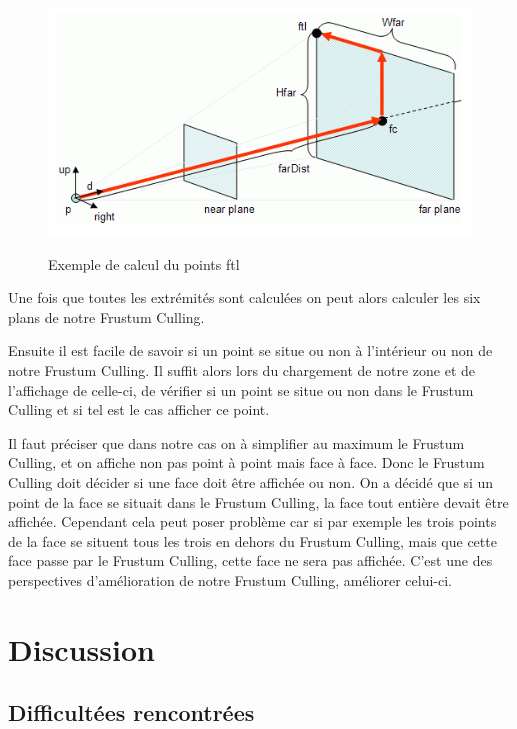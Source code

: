 \documentclass{report}
\begin{document}
			\begin{figure}[!h]
				\centering
				\includegraphics[scale=0.9]{images/pointsPlans.png}\\
				\caption{Exemple de calcul du points ftl}
				\label{calcul point}
			\end{figure}
			
			Une fois que toutes les extrémités sont calculées on peut alors calculer les six plans de notre Frustum Culling.
			
			Ensuite il est facile de savoir si un point se situe ou non à l'intérieur ou non de notre Frustum Culling. Il suffit alors lors du chargement de notre zone et de l'affichage de celle-ci, de vérifier si un point se situe ou non dans le Frustum Culling et si tel est le cas afficher ce point.
																						
			Il faut préciser que dans notre cas on à simplifier au maximum le Frustum Culling, et on affiche non pas point à point mais face à face. Donc le Frustum Culling doit décider si une face doit être affichée ou non. On a décidé que si un point de la face se situait dans le Frustum Culling, la face tout entière devait être affichée. Cependant cela peut poser problème car si par exemple les trois points de la face se situent tous les trois en dehors du Frustum Culling, mais que cette face passe par le Frustum Culling, cette face ne sera pas affichée. C'est une des perspectives d'amélioration de notre Frustum Culling, améliorer celui-ci.																

	\chapter{Discussion}
		\section{Difficultées rencontrées}
\end{document}
